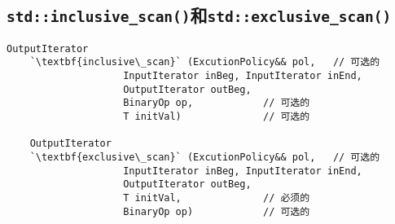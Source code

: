 \subsection{\texttt{std::inclusive\_scan()}和\texttt{std::exclusive\_scan()}}\label{ch23.2.3}
\begin{lstlisting}[frame=single,xleftmargin=13pt,xrightmargin=13pt]
    OutputIterator
    `\textbf{inclusive\_scan}` (ExcutionPolicy&& pol,   // 可选的
                    InputIterator inBeg, InputIterator inEnd,
                    OutputIterator outBeg,
                    BinaryOp op,            // 可选的
                    T initVal)              // 可选的

    OutputIterator
    `\textbf{exclusive\_scan}` (ExcutionPolicy&& pol,   // 可选的
                    InputIterator inBeg, InputIterator inEnd,
                    OutputIterator outBeg,
                    T initVal,              // 必须的
                    BinaryOp op)            // 可选的
\end{lstlisting}
